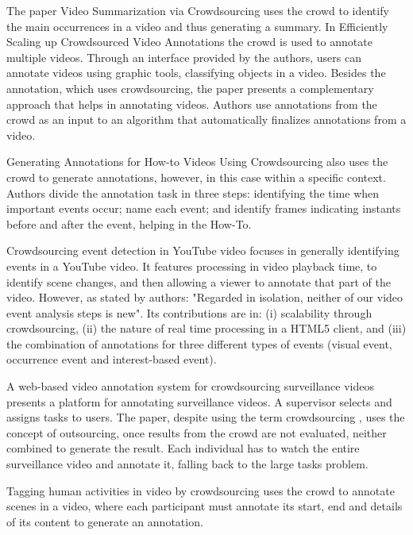 The paper Video Summarization via Crowdsourcing \cite{wu2011video} uses the crowd to identify the main occurrences in a video and thus generating a summary. In Efficiently Scaling up Crowdsourced Video Annotations \cite{vondrick2013efficiently} the crowd is used to annotate multiple videos. Through an interface provided by the authors, users can annotate videos using graphic tools, classifying objects in a video. Besides the annotation, which uses crowdsourcing, the paper presents a complementary approach that helps in annotating videos. Authors use annotations from the crowd as an input to an algorithm that automatically finalizes annotations from a video.

Generating Annotations for How-to Videos Using Crowdsourcing \cite{nguyen2013generating} also uses the crowd to generate annotations, however, in this case within a specific context. Authors divide the annotation task in three steps: identifying the time when important events occur; name each event; and identify frames indicating instants before and after the event, helping in the How-To.

Crowdsourcing event detection in YouTube video \cite{steiner2011crowdsourcing} focuses in generally identifying events in a YouTube video. It features processing in video playback time, to identify scene changes, and then allowing a viewer to annotate that part of the video. However, as stated by authors: "Regarded in isolation, neither of our video event analysis steps is new". Its contributions are in: (i) scalability through crowdsourcing, (ii) the nature of real time processing in a HTML5 client, and (iii) the combination of annotations for three different types of events (visual event, occurrence event and interest-based event).

A web-based video annotation system for crowdsourcing surveillance videos \cite{gadgil2014web} presents a platform for annotating surveillance videos. A supervisor selects and assigns tasks to users. The paper, despite using the term crowdsourcing	, uses the concept of outsourcing, once results from the crowd are not evaluated, neither combined to generate the result. Each individual has to watch the entire surveillance video and annotate it, falling back to the large tasks problem.

Tagging human activities in video by crowdsourcing \cite{nguyen2013tagging} uses the crowd to annotate scenes in a video, where each participant must annotate its start, end and details of its content to generate an annotation.
